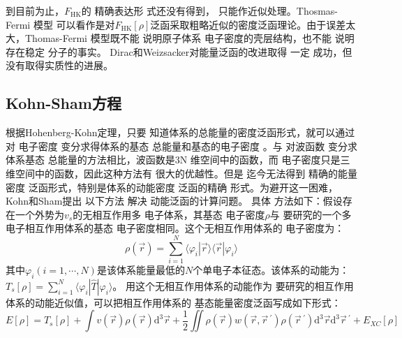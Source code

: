 到目前为止，$F_{\mathrm{HK}}$的%
{精确表达形}
式还没有得到，%
{只能作近似处理}。Thosmas-Fermi%
{模型}%
{可以看作是对$F_{\mathrm{HK}}[\rho]$泛函采取粗略近似的密度泛函理论。由于误差太}大，Thomas-Fermi%
{模型}既不能%
{说明}原子体系%
电子密度的壳层结构，也不能%
{说明存在}稳定%
分子{的事实}。%
Dirac\cite{PCPS26-376_1930}和Weizsacker\cite{ZP96-431_1935}对能量泛函的改进取得%
一定%
{成功}，但%
{没有取得实质性的进展}。

\subsection{Kohn-Sham方程}
{根据}Hohenberg-Kohn定理，只要%
{知道}体系的总能量的{密度}泛函形式，就可以通过对%
{电}子密度%
变分求得体系的基态%
{总能量和基态的电}子密度%
。与%
对波函数%
变分求%
体系基态%
{总能量}的方法相比，波函数是3N%
{维空间中的}函数，而%
{电}子密度只是三维{空间中的}函数，因此这种方法有%
{很}大的优越性。但是%
{迄今无法}得到%
精确的能量密度
泛函形式，特别是体系的动能密度
泛函的精确%
{形式。为避开这一困难}，Kohn和Sham\cite{PR140-A1133_1965}提出%
{以下}方法%
解决%
动能泛函的计算问题。%
具体%
方法如下：假设存在一个外势为$v_s$的无相互作用多%
{电}子体系，其基态%
{电}子密度$\rho$与%
{要}研究的一个多电子相互作用体系的基态%
{电}子密度相同。这个无相互作用体系的%
{电}子密度为：
$$\rho(\vec{r})=\sum_{i=1}^{N}\langle\varphi_{i}|\vec{r}\rangle\langle\vec{r}|\varphi_{i}\rangle$$
其中$\varphi_i(i\!=\!1,\cdots,N)$是该体系能量最低的$N$个{单电子}本征态。该体系的动能为：\linebreak $T_{s}[\rho]\!=\!\sum\limits_{i=1}^{N}\langle\varphi_{i}|\hat{T}|\varphi_{i}\rangle$。
用这个无相互作用体系的动能作为%
{要}研究的相互作用体系的动能近似{值}，可以把相互作用体系的%
{基态能量密度泛函}写成如下形式：
\begin{equation}
  \label{eq:dft-1}
E[\rho]=T_{s}[\rho]+\int{v(\vec{r})\rho(\vec{r})\textrm{d}^3\vec{r}}+\frac 12\iint{\rho(\vec{r})w(\vec{r},\vec r\,^{\prime})\rho(\vec r\,^{\prime})\textrm{d}^3\vec{r}\textrm{d}^3\vec r\,^{\prime}}+E_{XC}[\rho]
\end{equation}
